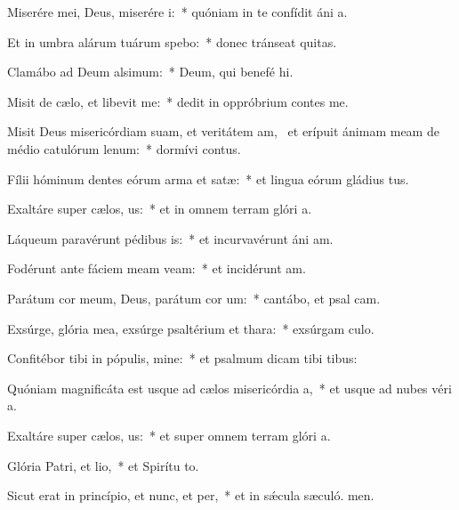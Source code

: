 \item Miserére mei, Deus, miserére i:~* quóniam in te confídit áni a.
\item Et in umbra alárum tuárum spebo:~* donec tránseat quitas.
\item Clamábo ad Deum alsimum:~* Deum, qui benefé hi.
\item Misit de cælo, et libevit me:~* dedit in oppróbrium contes me.
\item Misit Deus misericórdiam suam, et veritátem am,~\pscross{} et erípuit ánimam meam de médio catulórum lenum:~* dormívi contus.
\item Fílii hóminum dentes eórum arma et satæ:~* et lingua eórum gládius tus.
\item Exaltáre super cælos, us:~* et in omnem terram glóri a.
\item Láqueum paravérunt pédibus is:~* et incurvavérunt áni am.
\item Fodérunt ante fáciem meam veam:~* et incidérunt  am.
\item Parátum cor meum, Deus, parátum cor um:~* cantábo, et psal cam.
\item Exsúrge, glória mea, exsúrge psaltérium et thara:~* exsúrgam culo.
\item Confitébor tibi in pópulis, mine:~* et psalmum dicam tibi  tibus:
\item Quóniam magnificáta est usque ad cælos misericórdia a,~* et usque ad nubes véri a.
\item Exaltáre super cælos, us:~* et super omnem terram glóri a.
\item Glória Patri, et lio,~* et Spirítu to.
\item Sicut erat in princípio, et nunc, et per,~* et in sǽcula sæculó. men.
